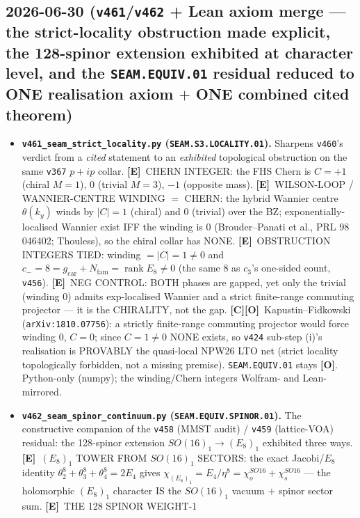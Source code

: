 \documentclass[11pt]{article}
\providecommand{\mE}{\textbf{[E]}}\providecommand{\mC}{\textbf{[C]}}
\providecommand{\mO}{\textbf{[O]}}\providecommand{\mX}{\textbf{[X]}}
\providecommand{\gcar}{g_{\mathrm{car}}}\providecommand{\Nfam}{N_{\mathrm{fam}}}
\begin{document}
\subsection*{2026-06-30 (\texttt{v461}/\texttt{v462} + Lean axiom merge --- the strict-locality obstruction made explicit, the 128-spinor extension exhibited at character level, and the \texttt{SEAM.EQUIV.01} residual reduced to ONE realisation axiom $+$ ONE combined cited theorem)}
\begin{itemize}
\item \textbf{\texttt{v461\_seam\_strict\_locality.py} (\texttt{SEAM.S3.LOCALITY.01}).} Sharpens \texttt{v460}'s verdict
from a \emph{cited} statement to an \emph{exhibited} topological obstruction on the same \texttt{v367} $p{+}ip$
collar. \mE\ CHERN INTEGER: the FHS Chern is $C{=}{+}1$ (chiral $M{=}1$), $0$ (trivial $M{=}3$), $-1$ (opposite
mass). \mE\ WILSON-LOOP / WANNIER-CENTRE WINDING $={}$ CHERN: the hybrid Wannier centre $\theta(k_y)$ winds by
$|C|{=}1$ (chiral) and $0$ (trivial) over the BZ; exponentially-localised Wannier exist IFF the winding is $0$
(Brouder--Panati et al., PRL 98 046402; Thouless), so the chiral collar has NONE. \mE\ OBSTRUCTION INTEGERS TIED:
winding $={}|C|{=}1{\neq}0$ and $c_-{=}8{=}\gcar{+}\Nfam{=}\operatorname{rank}E_8{\neq}0$ (the same $8$ as $c_3$'s
one-sided count, \texttt{v456}). \mE\ NEG CONTROL: BOTH phases are gapped, yet only the trivial (winding $0$) admits
exp-localised Wannier and a strict finite-range commuting projector --- it is the CHIRALITY, not the gap. \mC\mO\
Kapustin--Fidkowski (\texttt{arXiv:1810.07756}): a strictly finite-range commuting projector would force winding $0$,
$C{=}0$; since $C{=}1{\neq}0$ NONE exists, so \texttt{v424} sub-step (i)'s realisation is PROVABLY the quasi-local
NPW26 LTO net (strict locality topologically forbidden, not a missing premise). \texttt{SEAM.EQUIV.01} stays \mO.
Python-only (numpy); the winding/Chern integers Wolfram- and Lean-mirrored.
\item \textbf{\texttt{v462\_seam\_spinor\_continuum.py} (\texttt{SEAM.EQUIV.SPINOR.01}).} The constructive companion
of the \texttt{v458} (MMST audit) / \texttt{v459} (lattice-VOA) residual: the 128-spinor extension
$SO(16)_1{\to}(E_8)_1$ exhibited three ways. \mE\ $(E_8)_1$ TOWER FROM $SO(16)_1$ SECTORS: the exact Jacobi/$E_8$
identity $\theta_2^8{+}\theta_3^8{+}\theta_4^8{=}2E_4$ gives $\chi_{(E_8)_1}{=}E_4/\eta^8{=}\chi_o^{SO16}{+}\chi_s^{SO16}$
--- the holomorphic $(E_8)_1$ character IS the $SO(16)_1$ vacuum $+$ spinor sector sum. \mE\ THE 128 SPINOR WEIGHT-1

\end{itemize}
\end{document}
